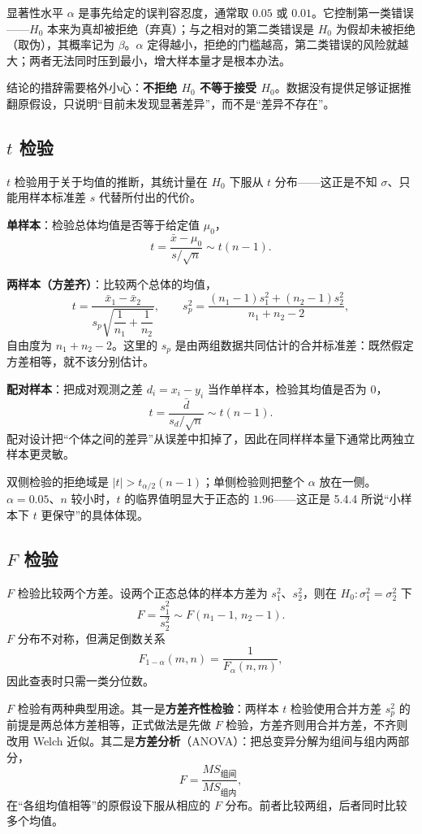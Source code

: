 \documentclass[UTF8]{ctexbook}
\begin{document}
显著性水平 $\alpha$ 是事先给定的误判容忍度，通常取 $0.05$ 或 $0.01$。它控制第一类错误——$H_0$ 本来为真却被拒绝（弃真）；与之相对的第二类错误是 $H_0$ 为假却未被拒绝（取伪），其概率记为 $\beta$。$\alpha$ 定得越小，拒绝的门槛越高，第二类错误的风险就越大；两者无法同时压到最小，增大样本量才是根本办法。

结论的措辞需要格外小心：\textbf{不拒绝 $H_0$ 不等于接受 $H_0$}。数据没有提供足够证据推翻原假设，只说明“目前未发现显著差异”，而不是“差异不存在”。

\subsection{$t$ 检验}

$t$ 检验用于关于均值的推断，其统计量在 $H_0$ 下服从 $t$ 分布——这正是不知 $\sigma$、只能用样本标准差 $s$ 代替所付出的代价。

\textbf{单样本}：检验总体均值是否等于给定值 $\mu_0$，
\[
t=\frac{\bar x-\mu_0}{s/\sqrt n}\sim t(n-1).
\]

\textbf{两样本（方差齐）}：比较两个总体的均值，
\[
t=\frac{\bar x_1-\bar x_2}{s_p\sqrt{\dfrac{1}{n_1}+\dfrac{1}{n_2}}},
\qquad
s_p^2=\frac{(n_1-1)s_1^2+(n_2-1)s_2^2}{n_1+n_2-2},
\]
自由度为 $n_1+n_2-2$。这里的 $s_p$ 是由两组数据共同估计的合并标准差：既然假定方差相等，就不该分别估计。

\textbf{配对样本}：把成对观测之差 $d_i=x_i-y_i$ 当作单样本，检验其均值是否为 $0$，
\[
t=\frac{\bar d}{s_d/\sqrt n}\sim t(n-1).
\]
配对设计把“个体之间的差异”从误差中扣掉了，因此在同样样本量下通常比两独立样本更灵敏。

双侧检验的拒绝域是 $|t|>t_{\alpha/2}(n-1)$；单侧检验则把整个 $\alpha$ 放在一侧。$\alpha=0.05$、$n$ 较小时，$t$ 的临界值明显大于正态的 $1.96$——这正是 5.4.4 所说“小样本下 $t$ 更保守”的具体体现。

\subsection{$F$ 检验}

$F$ 检验比较两个方差。设两个正态总体的样本方差为 $s_1^2$、$s_2^2$，则在 $H_0:\sigma_1^2=\sigma_2^2$ 下
\[
F=\frac{s_1^2}{s_2^2}\sim F(n_1-1,\,n_2-1).
\]
$F$ 分布不对称，但满足倒数关系
\[
F_{1-\alpha}(m,n)=\frac{1}{F_{\alpha}(n,m)},
\]
因此查表时只需一类分位数。

$F$ 检验有两种典型用途。其一是\textbf{方差齐性检验}：两样本 $t$ 检验使用合并方差 $s_p^2$ 的前提是两总体方差相等，正式做法是先做 $F$ 检验，方差齐则用合并方差，不齐则改用 Welch 近似。其二是\textbf{方差分析}（ANOVA）：把总变异分解为组间与组内两部分，
\[
F=\frac{MS_{\text{组间}}}{MS_{\text{组内}}},
\]
在“各组均值相等”的原假设下服从相应的 $F$ 分布。前者比较两组，后者同时比较多个均值。
\end{document}
